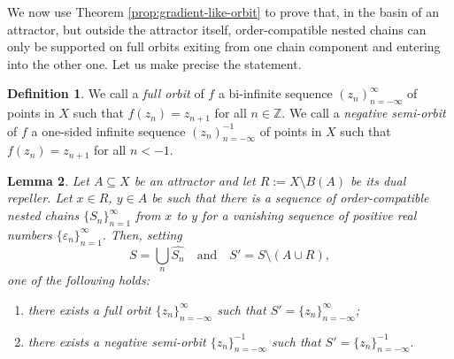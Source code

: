 \documentclass[10pt,a4paper]{article}
\theoremstyle{definition}
\newtheorem{defi}{Definition}[section]
\theoremstyle{remark}
\theoremstyle{plain}
\newtheorem{lem}[defi]{Lemma}
\begin{document}
We now use Theorem \ref{prop:gradient-like-orbit} to prove that, in the basin of an attractor, but outside the attractor itself, order-compatible nested chains can only be supported on full orbits exiting from one chain component and entering into the other one. Let us make precise the statement.

\begin{defi}
    We call a \emph{full orbit} of $f$ a bi-infinite sequence
    $(z_n)_{n=-\infty}^{\infty}$ of points in $X$ such that
    $f(z_n) = z_{n+1}$ for all $n\in\mathbb{Z}$. We call a \emph{negative semi-orbit} of $f$ a one-sided infinite sequence $(z_n)_{n=-\infty}^{-1}$ of points in $X$ such that $f(z_n) = z_{n+1}$ for all $n<-1$.
\end{defi}
\begin{lem}\label{lem:nested-contained-in-orbit}
    Let $A\subseteq X$ be an attractor and let $R:=X\setminus B(A)$ be its dual repeller. Let $x\in R$, $y\in A$ be such that there is a sequence of order-compatible nested chains $\{S_n\}_{n=1}^{\infty}$ from $x$ to $y$ for a vanishing sequence of positive real numbers $\{\varepsilon_n\}_{n=1}^\infty$. Then, setting
    $$S=\bigcup_n \widehat{S_n}\quad\text{and}\quad S'=S\setminus(A\cup R),$$
    one of the following holds:
\begin{enumerate}
    \item there exists a full orbit $\{z_n\}_{n=-\infty}^\infty$ such that $S'=\{z_n\}_{n=-\infty}^\infty$;
    \item there exists a negative semi-orbit $\{z_n\}_{n=-\infty}^{-1}$ such that $S'=\{z_n\}_{n=-\infty}^{-1}.$
\end{enumerate}  
\end{lem}
\end{document}
